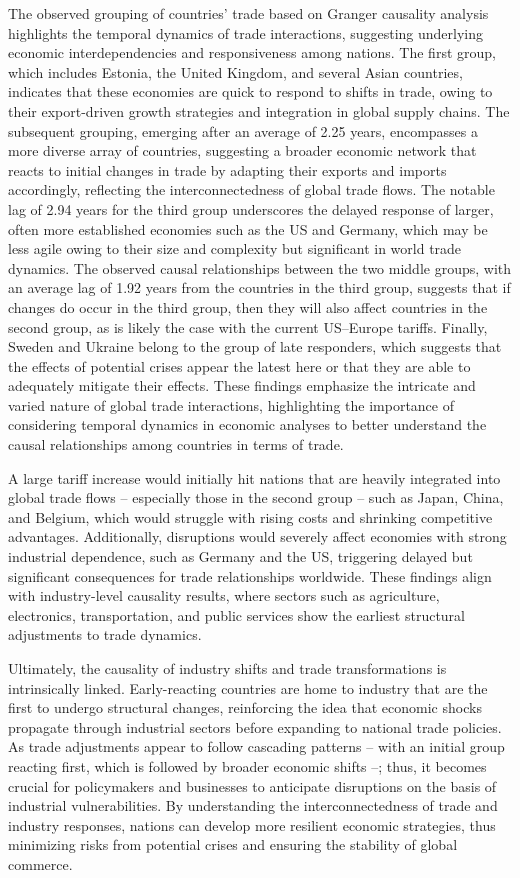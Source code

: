 \documentclass[preprint, 3p,
authoryear]{elsarticle} %
\begin{document}
The observed grouping of countries' trade based on Granger causality
analysis highlights the temporal dynamics of trade interactions,
suggesting underlying economic interdependencies and responsiveness
among nations. The first group, which includes Estonia, the United
Kingdom, and several Asian countries, indicates that these economies are
quick to respond to shifts in trade, owing to their export-driven growth
strategies and integration in global supply chains. The subsequent
grouping, emerging after an average of 2.25 years, encompasses a more
diverse array of countries, suggesting a broader economic network that
reacts to initial changes in trade by adapting their exports and imports
accordingly, reflecting the interconnectedness of global trade flows.
The notable lag of 2.94 years for the third group underscores the
delayed response of larger, often more established economies such as the
US and Germany, which may be less agile owing to their size and
complexity but significant in world trade dynamics. The observed causal
relationships between the two middle groups, with an average lag of 1.92
years from the countries in the third group, suggests that if changes do
occur in the third group, then they will also affect countries in the
second group, as is likely the case with the current US--Europe tariffs.
Finally, Sweden and Ukraine belong to the group of late responders,
which suggests that the effects of potential crises appear the latest
here or that they are able to adequately mitigate their effects. These
findings emphasize the intricate and varied nature of global trade
interactions, highlighting the importance of considering temporal
dynamics in economic analyses to better understand the causal
relationships among countries in terms of trade.

A large tariff increase would initially hit nations that are heavily
integrated into global trade flows -- especially those in the second
group -- such as Japan, China, and Belgium, which would struggle with
rising costs and shrinking competitive advantages. Additionally,
disruptions would severely affect economies with strong industrial
dependence, such as Germany and the US, triggering delayed but
significant consequences for trade relationships worldwide. These
findings align with industry-level causality results, where sectors such
as agriculture, electronics, transportation, and public services show
the earliest structural adjustments to trade dynamics.

Ultimately, the causality of industry shifts and trade transformations
is intrinsically linked. Early-reacting countries are home to industry
that are the first to undergo structural changes, reinforcing the idea
that economic shocks propagate through industrial sectors before
expanding to national trade policies. As trade adjustments appear to
follow cascading patterns -- with an initial group reacting first, which
is followed by broader economic shifts --; thus, it becomes crucial for
policymakers and businesses to anticipate disruptions on the basis of
industrial vulnerabilities. By understanding the interconnectedness of
trade and industry responses, nations can develop more resilient
economic strategies, thus minimizing risks from potential crises and
ensuring the stability of global commerce.
\end{document}
